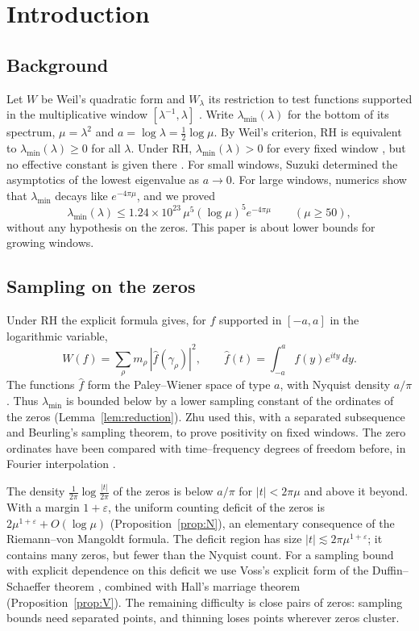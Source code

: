 \documentclass[11pt]{amsart}
\theoremstyle{definition}
\theoremstyle{remark}
\numberwithin{equation}{section}
\begin{document}
\section{Introduction}

\subsection{Background}
Let $W$ be Weil's quadratic form and $W_\lambda$ its restriction to test functions supported in the multiplicative window $[\lambda^{-1},\lambda]$ \cite{CC21,CCM25}. Write $\lambda_{\min}(\lambda)$ for the bottom of its spectrum, $\mu=\lambda^2$ and $a=\log\lambda=\frac12\log\mu$. By Weil's criterion, RH is equivalent to $\lambda_{\min}(\lambda)\ge0$ for all $\lambda$. Under RH, $\lambda_{\min}(\lambda)>0$ for every fixed window \cite[Prop.~2.3]{Zhu26}, but no effective constant is given there \cite[Rem.~2.4]{Zhu26}. For small windows, Suzuki \cite{Suzuki26} determined the asymptotics of the lowest eigenvalue as $a\to0$. For large windows, numerics show that $\lambda_{\min}$ decays like $e^{-4\pi\mu}$, and we proved \cite[Thm.~G(b)]{MoriWeilIII}
\begin{equation}\label{eq:upper}
\lambda_{\min}(\lambda)\le1.24\times10^{23}\,\mu^5(\log\mu)^5e^{-4\pi\mu}\qquad(\mu\ge50),
\end{equation}
without any hypothesis on the zeros. This paper is about lower bounds for growing windows.

\subsection{Sampling on the zeros}
Under RH the explicit formula gives, for $f$ supported in $[-a,a]$ in the logarithmic variable,
\[
W(f)=\sum_\rho m_\rho\,|\hat f(\gamma_\rho)|^2,\qquad \hat f(t)=\int_{-a}^af(y)e^{ity}\,dy .
\]
The functions $\hat f$ form the Paley--Wiener space of type $a$, with Nyquist density $a/\pi$. Thus $\lambda_{\min}$ is bounded below by a lower sampling constant of the ordinates of the zeros (Lemma~\ref{lem:reduction}). Zhu \cite[Prop.~2.3]{Zhu26} used this, with a separated subsequence and Beurling's sampling theorem, to prove positivity on fixed windows. The zero ordinates have been compared with time--frequency degrees of freedom before, in Fourier interpolation \cite{BRS23,Kulikov21}.

The density $\frac1{2\pi}\log\frac{|t|}{2\pi}$ of the zeros is below $a/\pi$ for $|t|<2\pi\mu$ and above it beyond. With a margin $1+\varepsilon$, the uniform counting deficit of the zeros is $2\mu^{1+\varepsilon}+O(\log\mu)$ (Proposition~\ref{prop:N}), an elementary consequence of the Riemann--von Mangoldt formula. The deficit region has size $|t|\lesssim2\pi\mu^{1+\varepsilon}$; it contains many zeros, but fewer than the Nyquist count. For a sampling bound with explicit dependence on this deficit we use Voss's explicit form of the Duffin--Schaeffer theorem \cite{Voss99}, combined with Hall's marriage theorem (Proposition~\ref{prop:V}). The remaining difficulty is close pairs of zeros: sampling bounds need separated points, and thinning loses points wherever zeros cluster.
\end{document}
